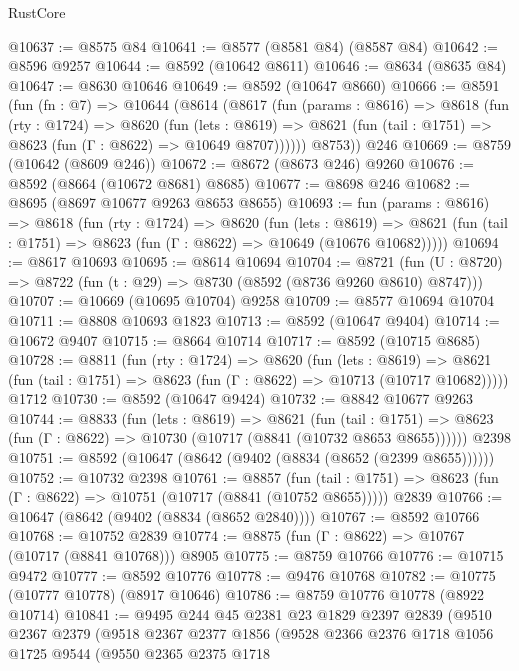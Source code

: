 \begin{lexlean}{RustCore}
\begin{coremodule}
@10637 := @8575 @84
@10641 := @8577 (@8581 @84) (@8587 @84)
@10642 := @8596 @9257
@10644 := @8592 (@10642 @8611)
@10646 := @8634 (@8635 @84)
@10647 := @8630 @10646
@10649 := @8592 (@10647 @8660)
@10666 := @8591
    (fun (fn : @7) =>
    @10644
      (@8614
        (@8617
          (fun (params : @8616) =>
          @8618
            (fun (rty : @1724) =>
            @8620
              (fun (lets : @8619) =>
              @8621 (fun (tail : @1751) => @8623 (fun (Γ : @8622) => @10649 @8707))))))
        @8753))
    @246
@10669 := @8759 (@10642 (@8609 @246))
@10672 := @8672 (@8673 @246) @9260
@10676 := @8592 (@8664 (@10672 @8681) @8685)
@10677 := @8698 @246
@10682 := @8695 (@8697 @10677 @9263 @8653 @8655)
@10693 := fun (params : @8616) =>
  @8618
    (fun (rty : @1724) =>
    @8620
      (fun (lets : @8619) =>
      @8621 (fun (tail : @1751) => @8623 (fun (Γ : @8622) => @10649 (@10676 @10682)))))
@10694 := @8617 @10693
@10695 := @8614 @10694
@10704 := @8721
    (fun (U : @8720) => @8722 (fun (t : @29) => @8730 (@8592 (@8736 @9260 @8610) @8747)))
@10707 := @10669 (@10695 @10704) @9258
@10709 := @8577 @10694 @10704
@10711 := @8808 @10693 @1823
@10713 := @8592 (@10647 @9404)
@10714 := @10672 @9407
@10715 := @8664 @10714
@10717 := @8592 (@10715 @8685)
@10728 := @8811
    (fun (rty : @1724) =>
    @8620
      (fun (lets : @8619) =>
      @8621 (fun (tail : @1751) => @8623 (fun (Γ : @8622) => @10713 (@10717 @10682)))))
    @1712
@10730 := @8592 (@10647 @9424)
@10732 := @8842 @10677 @9263
@10744 := @8833
    (fun (lets : @8619) =>
    @8621
      (fun (tail : @1751) =>
      @8623 (fun (Γ : @8622) => @10730 (@10717 (@8841 (@10732 @8653 @8655))))))
    @2398
@10751 := @8592 (@10647 (@8642 (@9402 (@8834 (@8652 (@2399 @8655))))))
@10752 := @10732 @2398
@10761 := @8857
    (fun (tail : @1751) => @8623 (fun (Γ : @8622) => @10751 (@10717 (@8841 (@10752 @8655)))))
    @2839
@10766 := @10647 (@8642 (@9402 (@8834 (@8652 @2840))))
@10767 := @8592 @10766
@10768 := @10752 @2839
@10774 := @8875 (fun (Γ : @8622) => @10767 (@10717 (@8841 @10768))) @8905
@10775 := @8759 @10766
@10776 := @10715 @9472
@10777 := @8592 @10776
@10778 := @9476 @10768
@10782 := @10775 (@10777 @10778) (@8917 @10646)
@10786 := @8759 @10776 @10778 (@8922 @10714)
@10841 := @9495
    @244
    @45
    @2381
    @23
    @1829
    @2397
    @2839
    (@9510
      @2367
      @2379
      (@9518
        @2367
        @2377
        @1856
        (@9528
          @2366
          @2376
          @1718
          @1056
          @1725
          @9544
          (@9550
            @2365
            @2375
            @1718

\end{coremodule}
\end{lexlean}
